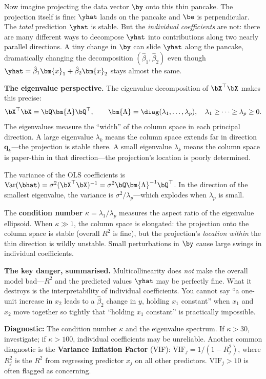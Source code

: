 Now imagine projecting the data vector $\by$ onto this thin pancake.
The projection itself is fine: $\yhat$ lands on the pancake and $\be$ is perpendicular.
The \emph{total} prediction $\yhat$ is stable.
But the \emph{individual coefficients} are not: there are many different ways to decompose $\yhat$ into contributions along two nearly parallel directions.
A tiny change in $\by$ can slide $\yhat$ along the pancake, dramatically changing the decomposition $(\hat{\beta}_1, \hat{\beta}_2)$ even though $\yhat = \hat{\beta}_1\bm{x}_1 + \hat{\beta}_2\bm{x}_2$ stays almost the same.

\medskip
\noindent\textbf{The eigenvalue perspective.}
The eigenvalue decomposition of $\bX^\top\bX$ makes this precise:
\[
  \bX^\top\bX = \bQ\bm{\Lambda}\bQ^\top,
  \qquad
  \bm{\Lambda} = \diag(\lambda_1,\dots,\lambda_p),
  \quad \lambda_1\ge\cdots\ge\lambda_p\ge 0.
\]
The eigenvalues measure the ``width'' of the column space in each principal direction.
A large eigenvalue $\lambda_k$ means the column space extends far in direction $\bm{q}_k$---the projection is stable there.
A small eigenvalue $\lambda_k$ means the column space is paper-thin in that direction---the projection's location is poorly determined.

The variance of the OLS coefficients is $\text{Var}(\bhat) = \sigma^2(\bX^\top\bX)^{-1} = \sigma^2\bQ\bm{\Lambda}^{-1}\bQ^\top$.
In the direction of the smallest eigenvalue, the variance is $\sigma^2/\lambda_p$---which explodes when $\lambda_p$ is small.

The \textbf{condition number} $\kappa = \lambda_1/\lambda_p$
measures the aspect ratio of the eigenvalue ellipsoid.
When $\kappa \gg 1$, the column space is elongated: the projection
onto the column space is stable (overall $R^2$ is fine), but the
projection's \emph{location within} the thin direction is wildly
unstable. Small perturbations in $\by$ cause large swings
in individual coefficients.

\medskip
\noindent\textbf{The key danger, summarised.}
Multicollinearity does \emph{not} make the overall model bad---$R^2$ and the predicted values $\yhat$ may be perfectly fine.
What it destroys is the interpretability of individual coefficients.
You cannot say ``a one-unit increase in $x_2$ leads to a $\hat{\beta}_2$ change in $y$, holding $x_1$ constant'' when $x_1$ and $x_2$ move together so tightly that ``holding $x_1$ constant'' is practically impossible.

\medskip
\noindent\textbf{Diagnostic:} The condition number $\kappa$ and the
eigenvalue spectrum. If $\kappa > 30$, investigate; if $\kappa > 100$,
individual coefficients may be unreliable.
Another common diagnostic is the \textbf{Variance Inflation Factor}
(VIF): $\text{VIF}_j = 1/(1-R_j^2)$, where $R_j^2$ is the $R^2$ from
regressing predictor $x_j$ on all other predictors.
$\text{VIF}_j > 10$ is often flagged as concerning.

